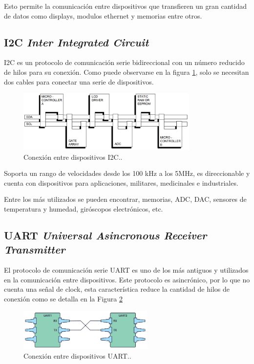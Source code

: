 Esto permite la comunicación entre dispositivos que transfieren un gran cantidad de datos como displays, modulos ethernet y memorias entre otros. 


\subsection{I2C \textit{Inter Integrated Circuit}}

I2C es un protocolo de comunicación serie  bidireccional con un número reducido de hilos para su conexión. Como puede observarse en la figura \ref{fig:I2C}, solo se necesitan dos cables para conectar una serie de dispositivos.

\begin{figure}[htbp]
	\centering
	\includegraphics[width=0.8\textwidth]{./Figures/I2C.png}
	\caption{Conexión entre dispositivos I2C.\protect\footnotemark.}
	\label{fig:I2C}
\end{figure} 

Soporta un rango de velocidades desde los 100 kHz a los 5MHz, es direccionable y cuenta con dispositivos para aplicaciones, militares, medicinales e industriales.

Entre los más utilizados se pueden encontrar, memorias, ADC, DAC, sensores de temperatura y humedad, giróscopos electrónicos, etc.

\subsection{UART \textit{Universal Asincronous Receiver Transmitter}}

El protocolo de comunicación serie UART es uno de los más antiguos y utilizados en la comunicación entre dispositivos. Este protocolo es asincrónico, por lo que no cuenta una señal de clock, esta característica reduce la cantidad de hilos de conexión como se detalla en la Figura \ref{fig:UART}


\begin{figure}[htbp]
	\centering
	\includegraphics[width=0.6\textwidth]{./Figures/UART.png}
	\caption{Conexión entre dispositivos UART.\protect\footnotemark.}
	\label{fig:UART}
\end{figure} 

